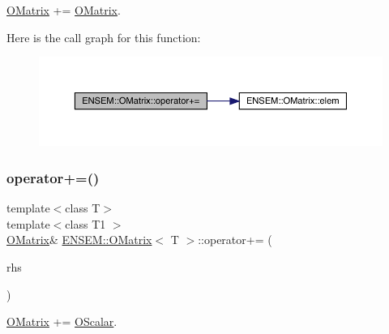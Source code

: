 \mbox{\hyperlink{classENSEM_1_1OMatrix}{O\+Matrix}} += \mbox{\hyperlink{classENSEM_1_1OMatrix}{O\+Matrix}}. 

Here is the call graph for this function\+:
\nopagebreak
\begin{figure}[H]
\begin{center}
\leavevmode
\includegraphics[width=350pt]{dd/d80/classENSEM_1_1OMatrix_a221eb5f9e17402ad93c829fcaf2ac60a_cgraph}
\end{center}
\end{figure}
\mbox{\label{classENSEM_1_1OMatrix_ab488697fd72f3891fede3d00f8deb019}} 
\subsubsection{\texorpdfstring{operator+=()}{operator+=()}\hspace{0.1cm}{\footnotesize\ttfamily [4/6]}}
{\footnotesize\ttfamily template$<$class T$>$ \\
template$<$class T1 $>$ \\
\mbox{\hyperlink{classENSEM_1_1OMatrix}{O\+Matrix}}\& \mbox{\hyperlink{classENSEM_1_1OMatrix}{E\+N\+S\+E\+M\+::\+O\+Matrix}}$<$ T $>$\+::operator+= (\begin{DoxyParamCaption}\item[{const \mbox{\hyperlink{classENSEM_1_1OScalar}{O\+Scalar}}$<$ T1 $>$ \&}]{rhs }\end{DoxyParamCaption})\hspace{0.3cm}{\ttfamily [inline]}}



\mbox{\hyperlink{classENSEM_1_1OMatrix}{O\+Matrix}} += \mbox{\hyperlink{classENSEM_1_1OScalar}{O\+Scalar}}. 

